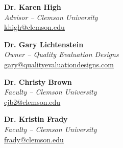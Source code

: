 
\begin{flushleft}
\textbf{Dr. Karen High} \\
\textit{Advisor – Clemson University} \\
\href{mailto:khigh@clemson.edu}{\underline{khigh@clemson.edu}}

\vspace{1em}

\textbf{Dr. Gary Lichtenstein} \\
\textit{Owner – Quality Evaluation Designs} \\
\href{mailto:gary@qualityevaluationdesigns.com}{\underline{gary@qualityevaluationdesigns.com}}

\vspace{1em}

\textbf{Dr. Christy Brown} \\
\textit{Faculty – Clemson University} \\
\href{mailto:cjb2@clemson.edu}{\underline{cjb2@clemson.edu}}

\vspace{1em}

\textbf{Dr. Kristin Frady} \\
\textit{Faculty – Clemson University} \\
\href{mailto:frady@clemson.edu}{\underline{frady@clemson.edu}}
\end{flushleft}
